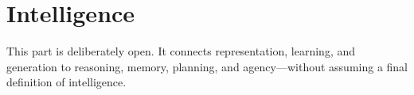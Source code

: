 \part{Intelligence}
\label{part:intelligence}

This part is deliberately open. It connects representation, learning, and generation to reasoning, memory, planning, and agency---without assuming a final definition of intelligence.
